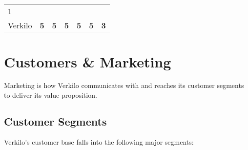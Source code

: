 \documentclass[10pt,openany]{book}
\begin{document}
\begin{longtable}[]{@{}lcccccc@{}}
\begin{minipage}[t]{0.10\columnwidth}
1\strut
\end{minipage}\tabularnewline
\begin{minipage}[t]{0.29\columnwidth}\raggedright
Verkilo\strut
\end{minipage} & \begin{minipage}[t]{0.09\columnwidth}\centering
\textbf{5}\strut
\end{minipage} & \begin{minipage}[t]{0.08\columnwidth}\centering
\textbf{5}\strut
\end{minipage} & \begin{minipage}[t]{0.09\columnwidth}\centering
\textbf{5}\strut
\end{minipage} & \begin{minipage}[t]{0.07\columnwidth}\centering
\textbf{5}\strut
\end{minipage} & \begin{minipage}[t]{0.10\columnwidth}\centering
\textbf{5}\strut
\end{minipage} & \begin{minipage}[t]{0.10\columnwidth}\centering
\textbf{3}\strut
\end{minipage}\tabularnewline
\bottomrule
\end{longtable}

\hypertarget{customers-marketing}{%
\chapter{Customers \& Marketing}\label{customers-marketing}}

Marketing is how Verkilo communicates with and reaches its customer
segments to deliver its value proposition.

\hypertarget{customer-segments}{%
\section{Customer Segments}\label{customer-segments}}

Verkilo's customer base falls into the following major segments:
\end{document}
